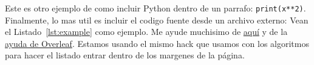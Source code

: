 Este es otro ejemplo de como incluir Python dentro de un parrafo: \texttt{print(x**2)}.
Finalmente, lo mas util es incluir el codigo fuente desde un archivo externo: Vean  el Listado~\ref{lst:example} como ejemplo.
Me ayude muchisimo de \href{https://tex.stackexchange.com/questions/252263/alignment-of-minted-line-numbers}{aquí} y de la \href{https://www.overleaf.com/learn/latex/Code_Highlighting_with_minted}{ayuda de Overleaf}.
Estamos usando el mismo \textenglish{hack} que usamos con los algoritmos para hacer el listado entrar dentro de los margenes de la página.

{\centering
\begin{minipage}{\linewidth}
\end{minipage}
\par
}
